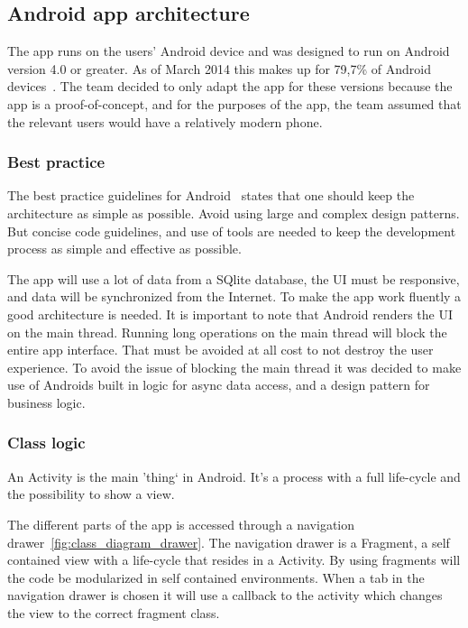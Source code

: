 \subsection{Android app architecture}
The app runs on the users' Android device and was designed to run on Android version 4.0 or greater. As of March 2014 this makes up for 79,7\% of Android devices~\cite{AndroidDeviceFragmentation}. 
The team decided to only adapt the app for these versions because the app is a proof-of-concept, and for the purposes of the app, the team assumed that the relevant users would have a relatively modern phone. 

\subsubsection{Best practice}

The best practice guidelines for Android~\cite{androidPracticePerformance} states that one should keep the architecture as simple as possible. 
Avoid using large and complex design patterns. But concise code guidelines, and use of tools are needed to keep the development process as simple and effective as possible. 

The app will use a lot of data from a SQlite database, the UI must be responsive, and data will be synchronized from the Internet. To make the app work fluently a good architecture is needed. It is important to note that Android renders the UI on the main thread. Running long operations on the main thread will block the entire app interface. That must be avoided at all cost to not destroy the user experience. 
To avoid the issue of blocking the main thread it was decided to make use of Androids built in logic for async data access, and a design pattern for business logic.

\subsubsection{Class logic}

An Activity is the main 'thing` in Android. It's a process with a full life-cycle and the possibility to show a view. 

The different parts of the app is accessed through a navigation drawer~\ref{fig:class_diagram_drawer}. The navigation drawer is a Fragment, a self contained view with a life-cycle that resides in a Activity. By using fragments will the code be modularized in self contained environments. When a tab in the navigation drawer is chosen it will use a callback to the activity which changes the view to the correct fragment class. 

